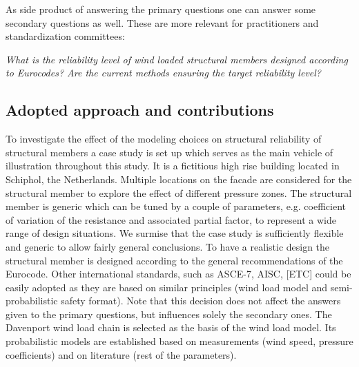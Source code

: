 \documentclass[fleqn]{article}
\begin{document}

As side product of answering the primary questions one can answer some secondary questions as well. These are more relevant for practitioners and standardization committees:

\textit{What is the reliability level of wind loaded structural members designed according to Eurocodes? Are the current methods ensuring the target reliability level?}

 
\subsection{Adopted approach and contributions}

To investigate the effect of the modeling choices on structural reliability of structural members a case study is set up which serves as the main vehicle of illustration throughout this study. It is a fictitious high rise building located in Schiphol, the Netherlands. Multiple locations on the facade are considered for the structural member to explore the effect of different pressure zones. The structural member is generic which can be tuned by a couple of parameters, e.g. coefficient of variation of the resistance and associated partial factor, to represent a wide range of design situations. We surmise that the case study is sufficiently flexible and generic to allow fairly general conclusions. To have a realistic design the structural member is designed according to the general recommendations of the Eurocode. Other international standards, such as ASCE-7, AISC, [ETC] could be easily adopted as they are based on similar principles (wind load model and semi-probabilistic safety format). Note that this decision does not affect the answers given to the primary questions, but influences solely the secondary ones.
The Davenport wind load chain is selected as the basis of the wind load model. Its probabilistic models are established based on measurements (wind speed, pressure coefficients) and on literature (rest of the parameters).
\end{document}
